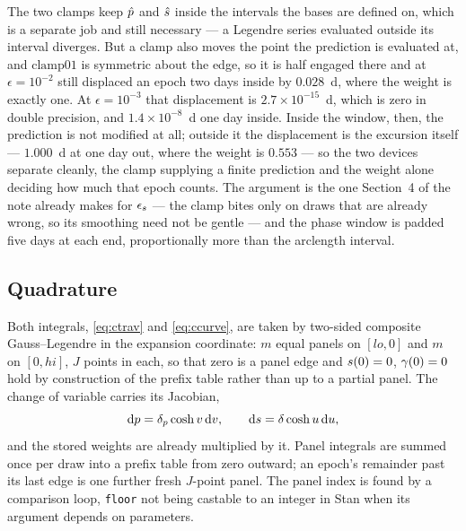 \documentclass[11pt]{article}
\newcommand{\code}[1]{\texttt{#1}}
\begin{document}
The two clamps keep $\hat{p}$ and $\hat{s}$ inside the intervals the bases are defined
on, which is a separate job and still necessary --- a Legendre series evaluated outside its
interval diverges. But a clamp also moves the point the prediction is evaluated at, and
$\mathrm{clamp01}$ is symmetric about the edge, so it is half engaged there and at
$\epsilon = 10^{-2}$ still displaced an epoch two days inside by $0.028$~d, where the
weight is exactly one. At $\epsilon = 10^{-3}$ that displacement is $2.7\times10^{-15}$~d,
which is zero in double precision, and $1.4\times10^{-8}$~d one day inside. Inside the
window, then, the prediction is not modified at all; outside it the displacement is the
excursion itself --- $1.000$~d at one day out, where the weight is $0.553$ --- so the two
devices separate cleanly, the clamp supplying a finite prediction and the weight alone
deciding how much that epoch counts. The argument is the one Section~4 of the note already makes for
$\epsilon_{s}$ --- the clamp bites only on draws that are already wrong, so its
smoothing need not be gentle --- and the phase window is padded five days at each end,
proportionally more than the arclength interval.

\subsection{Quadrature}

Both integrals, \eqref{eq:ctrav} and \eqref{eq:ccurve}, are taken by two-sided composite
Gauss--Legendre in the expansion coordinate: $m$ equal panels on $[lo, 0]$ and $m$ on
$[0, hi]$, $J$ points in each, so that zero is a panel edge and $s(0) = 0$,
$\gamma(0) = 0$ hold by construction of the prefix table rather than up to a partial panel.
The change of variable carries its Jacobian,
\begin{equation}
  \mathrm{d}p = \delta_{p}\cosh v\,\mathrm{d} v , \qquad \mathrm{d}s = \delta\cosh u\,\mathrm{d} u ,
\end{equation}
and the stored weights are already multiplied by it. Panel integrals are summed once per
draw into a prefix table from zero outward; an epoch's remainder past its last edge is one
further fresh $J$-point panel. The panel index is found by a comparison loop, \code{floor}
not being castable to an integer in Stan when its argument depends on parameters.
\end{document}
